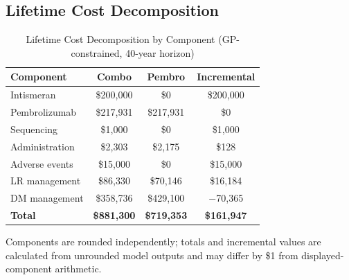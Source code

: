 \documentclass[11pt,a4paper]{article}
\begin{document}
\subsection{Lifetime Cost Decomposition}
\label{sec:cost_decomp}
\begin{table}[H]
\centering
\caption{Lifetime Cost Decomposition by Component (GP-constrained, 40-year horizon)}
\label{tab:s9}
\begin{tabular*}{\textwidth}{@{\extracolsep{\fill}}lccc}
\toprule
\textbf{Component} & \textbf{Combo} & \textbf{Pembro} & \textbf{Incremental} \\
\midrule
Intismeran & \$200,000 & \$0 & \$200,000 \\
Pembrolizumab & \$217,931 & \$217,931 & \$0 \\
Sequencing & \$1,000 & \$0 & \$1,000 \\
Administration & \$2,303 & \$2,175 & \$128 \\
Adverse events & \$15,000 & \$0 & \$15,000 \\
LR management & \$86,330 & \$70,146 & \$16,184 \\
DM management & \$358,736 & \$429,100 & $-$70,365 \\
\midrule
\textbf{Total} & \textbf{\$881,300} & \textbf{\$719,353} & \textbf{\$161,947} \\
\bottomrule
\end{tabular*}
\vspace{2pt}
{\footnotesize\raggedright Components are rounded independently; totals and incremental values are calculated from unrounded model outputs and may differ by \$1 from displayed-component arithmetic.\par}
\end{table}
\end{document}
